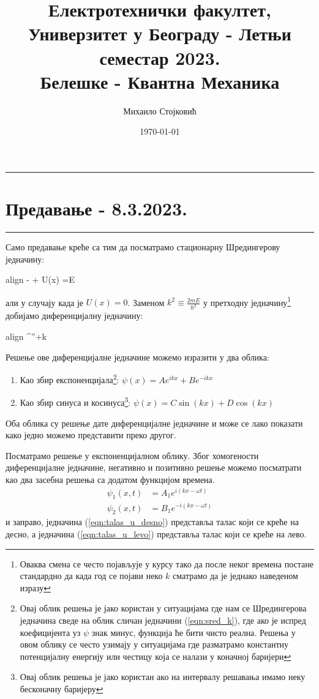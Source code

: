 \documentclass{tufte-handout} %
\title{	
	\normalfont\normalsize 
	{Електротехнички факултет, Универзитет у Београду - Летњи семестар 2023.} \\ [0pt] %
	\huge Белешке - Квантна Механика%
}\author{Михаило Стојковић} %
\date{\vspace{-5pt}\normalsize\today} %
\newcommand{\boxedeq}[1]{\begin{empheq}[box={\fboxsep=6pt\fbox}]{align} #1\end{empheq}}
\theoremstyle{definition}
\theoremstyle{remark}
\newcommand{\shreq}[2]{-\frac{\hbar^2}{2m}\frac{\partial^2 #1}{\partial #2^2} + U(#2) #1 =E #1}
\newcommand{\kpsi}{\psi^{''}+k\psi=0}
\begin{document}
\justifying 
\maketitle

\tableofcontents
\newpage
\vspace{1em}
\hrule
\section{Предавање - 8.3.2023.}
\hrule
\vspace{1em}
Само предавање креће са тим да посматрамо стационарну Шредингерову једначину:
	\boxedeq{\shreq{\psi}{x}}
али у случају када је $U(x)=0$. Заменом $k^2\equiv\frac{2mE}{\hbar^2}$ у претходну једначину\footnote{Оваква смена се често појављује у курсу тако да после неког времена постане стандардно да када год се појави неко $k$ сматрамо да је једнако наведеном изразу} добијамо диференцијалну једначину:
	\boxedeq{\label{eqn:sred_k}\kpsi}
Решење ове диференцијалне једначине можемо изразити у два облика:
\begin{enumerate}
	\item Као збир експоненцијала\footnote{Овај облик решења је јако користан у ситуацијама где нам се Шредингерова једначина сведе на облик сличан једначини (\ref{eqn:sred_k}), где ако је испред коефицијента уз $\psi$ знак минус, функција ће бити чисто реална. Решења у овом облику се често узимају у ситуацијама где разматрамо константну потенцијалну енергију или честицу која се налази у коначној баријери}: $\psi(x)=Ae^{ikx} + Be^{-ikx}$
	\item Као збир синуса и косинуса\footnote{Овај облик решења је јако користан ако на интервалу решавања имамо неку бесконачну баријеру}: $\psi(x)=C\sin(kx)+D\cos(kx)$
\end{enumerate}
Оба облика су решење дате диференцијалне једначине и може се лако показати како једно можемо представити преко другог.\par
Посматрамо решење у експоненцијалном облику. Због хомогености диференцијалне једначине, негативно и позитивно решење можемо посматрати као два засебна решења са додатом функцијом времена.
\begin{align}
	\label{eqn:talas_u_desno}\psi_1(x,t)&=A_1e^{i(kx-\omega t)}\\
	\label{eqn:talas_u_levo}\psi_2(x,t)&=B_1e^{-i(kx-\omega t)} 
\end{align}
и заправо, једначина (\ref{eqn:talas_u_desno}) представља талас који се креће на десно, а једначина (\ref{eqn:talas_u_levo}) представља талас који се креће на лево.
\end{document}
